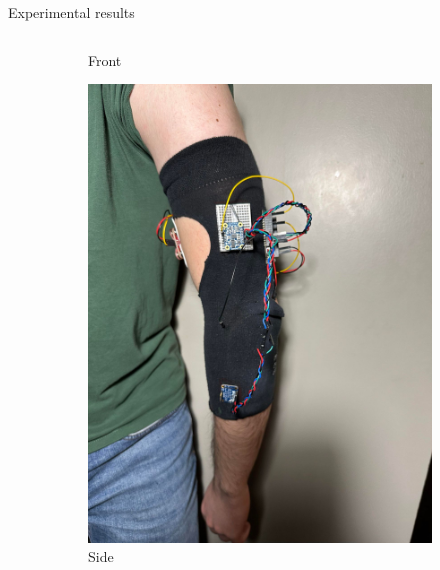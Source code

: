 \documentclass[aspectratio=169]{beamer}
\begin{document}
\begin{frame}{Experimental results}
\begin{columns}
\begin{column}{0.5\textwidth}
\begin{figure}[htbp]
\begin{subfigure}{0.3\textwidth}
        \caption{Front}
    \end{subfigure}
    \begin{subfigure}{0.3\textwidth}
        \centering
        \includegraphics[width=\linewidth]{side_view.jpg}
        \caption{Side}
    \end{subfigure}
    \begin{subfigure}{0.3\textwidth}
        \centering

\end{subfigure}
\end{figure}
\end{column}
\end{columns}
\end{frame}
\end{document}
